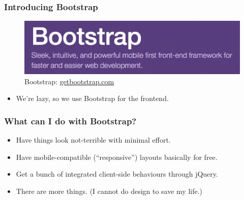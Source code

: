 \documentclass{beamer}
\begin{document}
\begin{frame}
  \frametitle{Introducing Bootstrap}
  \begin{figure}[h!]
    \centering
    \includegraphics[scale=0.3]{imgs/bootstrap_banner.png}
    \caption{Bootstrap: \url{getbootstrap.com}}
    \label{fig:bootstrap_banner}
  \end{figure}

  \begin{itemize}
  \item We're lazy, so we use Bootstrap for the frontend.
\end{itemize}
\end{frame}

\begin{frame}
  \frametitle{What can I do with Bootstrap?}
  \begin{itemize}
  \item Have things look not-terrible with minimal effort.
  \item Have mobile-compatible (``responsive'') layouts basically for
    free.
  \item Get a bunch of integrated client-side behaviours through
    jQuery.
  \item There are more things. (I cannot do design to save my life.)
  \end{itemize}
\end{frame}
\end{document}
